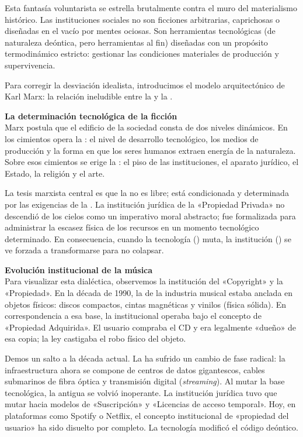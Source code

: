 Esta fantasía voluntarista se estrella brutalmente contra el muro del materialismo histórico. Las instituciones sociales no son ficciones arbitrarias, caprichosas o diseñadas en el vacío por mentes ociosas. Son herramientas tecnológicas (de naturaleza deóntica, pero herramientas al fin) diseñadas con un propósito termodinámico estricto: gestionar las condiciones materiales de producción y supervivencia.

Para corregir la desviación idealista, introducimos el modelo arquitectónico de Karl Marx: la relación ineludible entre la \textbf{\BaseMaterial} y la \textbf{\Superestructura}.

\begin{argumento}
\textbf{La determinación tecnológica de la ficción}\\
Marx postula que el edificio de la sociedad consta de dos niveles dinámicos. En los cimientos opera la \BaseMaterial: el nivel de desarrollo tecnológico, los medios de producción y la forma en que los seres humanos extraen energía de la naturaleza. Sobre esos cimientos se erige la \Superestructura: el piso de las instituciones, el aparato jurídico, el Estado, la religión y el arte.

La tesis marxista central es que la \Superestructura{} no es libre; está condicionada y determinada por las exigencias de la \BaseMaterial. La institución jurídica de la «Propiedad Privada» no descendió de los cielos como un imperativo moral abstracto; fue formalizada para administrar la escasez física de los recursos en un momento tecnológico determinado. En consecuencia, cuando la tecnología (\HechoBruto) muta, la institución (\FuncionEstatus) se ve forzada a transformarse para no colapsar.
\end{argumento}

\begin{ejemplo}
\textbf{Evolución institucional de la música}\\
Para visualizar esta dialéctica, observemos la institución del «Copyright» y la «Propiedad». 
En la década de 1990, la \BaseMaterial{} de la industria musical estaba anclada en objetos físicos: discos compactos, cintas magnéticas y vinilos (física sólida). En correspondencia a esa base, la \Superestructura{} institucional operaba bajo el concepto de «Propiedad Adquirida». El usuario compraba el CD y era legalmente «dueño» de esa copia; la ley castigaba el robo físico del objeto.

Demos un salto a la década actual. La \BaseMaterial{} ha sufrido un cambio de fase radical: la infraestructura ahora se compone de centros de datos gigantescos, cables submarinos de fibra óptica y transmisión digital (\textit{streaming}). Al mutar la base tecnológica, la antigua \Superestructura{} se volvió inoperante. La institución jurídica tuvo que mutar hacia modelos de «Suscripción» y «Licencias de acceso temporal». Hoy, en plataformas como Spotify o Netflix, el concepto institucional de «propiedad del usuario» ha sido disuelto por completo. La tecnología modificó el código deóntico.
\end{ejemplo}

